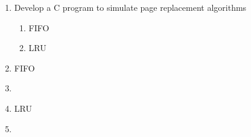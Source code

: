 \documentclass{article}
\newcommand{\question}[2]{
	\item [#1.] #2
}
\newcommand{\answer}[1]{\item[] \inputminted{c}{#1}}
\begin{document}
	\begin{enumerate}[label=\roman*)]
		\question{7}{
			Develop a C program to simulate page replacement algorithms
			\begin{enumerate}
				\item FIFO
				\item LRU
			\end{enumerate}
		}

		\item FIFO
		\answer{lab7.fifo.c} \newpage

		\item LRU
		\answer{lab7.lru.c}
	\end{enumerate}
\end{document}
